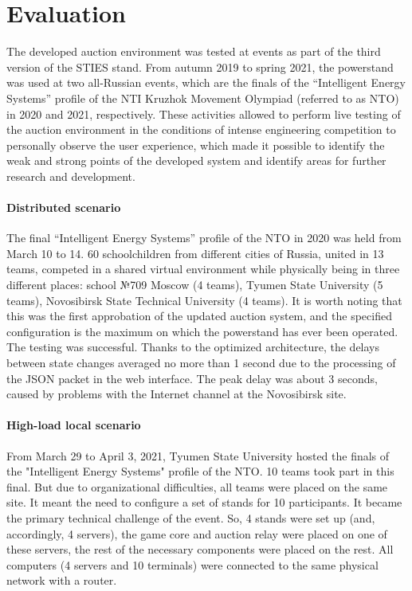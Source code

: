 \documentclass[
]{ceurart}
\begin{document}
\section{Evaluation}
\label{sec:eval}

The developed auction environment was tested at events as part of the third version of the STIES stand. From autumn 2019 to spring 2021, the powerstand was used at two all-Russian events, which are the finals of the ``Intelligent Energy Systems'' profile of the NTI Kruzhok Movement Olympiad (referred to as NTO) in 2020 and 2021, respectively. These activities allowed to perform live testing of the auction environment in the conditions of intense engineering competition to personally observe the user experience, which made it possible to identify the weak and strong points of the developed system and identify areas for further research and development.

\paragraph{Distributed scenario}
\label{sec:eval-distr}
The final “Intelligent Energy Systems” profile of the NTO in 2020 was held from March 10 to 14. 60 schoolchildren from different cities of Russia, united in 13 teams, competed in a shared virtual environment while physically being in three different places:
school №709 Moscow (4 teams),
Tyumen State University (5 teams),
Novosibirsk State Technical University (4 teams).
It is worth noting that this was the first approbation of the updated auction system, and the specified configuration is the maximum on which the powerstand has ever been operated. The testing was successful. Thanks to the optimized architecture, the delays between state changes averaged no more than 1 second due to the processing of the JSON packet in the web interface. The peak delay was about 3 seconds, caused by problems with the Internet channel at the Novosibirsk site.

\paragraph{High-load local scenario}
\label{sec:eval-high}
From March 29 to April 3, 2021, Tyumen State University hosted the finals of the "Intelligent Energy Systems" profile of the NTO. 10 teams took part in this final. But due to organizational difficulties, all teams were placed on the same site. It meant the need to configure a set of stands for 10 participants. It became the primary technical challenge of the event. So, 4 stands were set up (and, accordingly, 4 servers), the game core and auction relay were placed on one of these servers, the rest of the necessary components were placed on the rest. All computers (4 servers and 10 terminals) were connected to the same physical network with a router.
\end{document}
